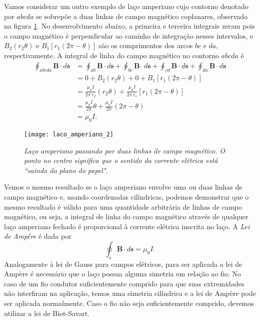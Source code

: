 Vamos considerar um outro exemplo de laço amperiano cujo contorno denotado por $abcda$ se sobrepõe a duas linhas de campo magnético coplanares, observado na figura \ref{fig.laco_amper_2}. No desenvolvimento abaixo, a primeira e terceira integrais zeram pois o campo magnético é perpendicular ao caminho de integração nesses intervalos, e $B_2(r_2\theta)$ e $B_1[r_1(2\pi-\theta)]$ são os comprimentos dos arcos $bc$ e $da$, respectivamente. A integral de linha do campo magnético no contorno $abcda$ é
\begin{align*}
\oint_{abcda}\textbf{B}\cdot d\textbf{s}&=\oint_{ab}\textbf{B}\cdot d\textbf{s}+\oint_{bc}\textbf{B}\cdot d\textbf{s}+\oint_{cd}\textbf{B}\cdot d\textbf{s}+\oint_{da}\textbf{B}\cdot d\textbf{s}\\
&=0+B_2(r_2\theta)+0+B_1[r_1(2\pi-\theta)]\\
&=\frac{\mu_0I}{2\pi\,r_2}(r_2\theta)+\frac{\mu_0I}{2\pi\,r_1}[r_1(2\pi-\theta)]\\
&=\frac{\mu_0I}{2\pi}\theta+\frac{\mu_0I}{2\pi}(2\pi-\theta)\\
&=\mu_0I.
\end{align*}
\begin{figure}
\centering
\texttt{[image: laco\_amperiano\_2]}
\caption{\textit{Laço amperiano passando por duas linhas de campo magnético. O ponto no centro significa que o sentido da corrente elétrica está ``saindo do plano do papel".}}
\label{fig.laco_amper_2}
\end{figure}
Vemos o mesmo resultado se o laço amperiano envolve uma ou duas linhas de campo magnético e, usando coordenadas cilíndricas, podemos demonstrar que o mesmo resultado é válido para uma quantidade arbitrária de linhas de campo magnético, ou seja, a integral de linha do campo magnético através de qualquer laço amperiano fechado é proporcional à corrente elétrica inscrita no laço. A \textit{Lei de Ampère} é dada por
\begin{equation*}
\oint_{s}\textbf{B}\cdot d\textbf{s}=\mu_0I.
\end{equation*}
Analogamente à lei de Gauss para campos elétricos, para ser aplicada a lei de Ampère é necessário que o laço possua alguma simetria em relação ao fio. No caso de um fio condutor suficientemente comprido para que suas extremidades não interfiram na aplicação, temos uma simetria cilíndrica e a lei de Ampère pode ser aplicada normalmente. Caso o fio não seja suficientemente comprido, devemos utilizar a lei de Biot-Savart. 

